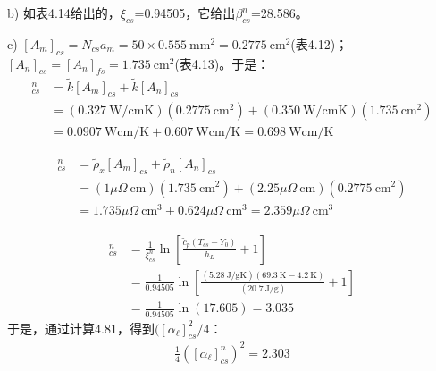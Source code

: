 b) 如表4.14给出的，$\xi_{cs}$=0.94505，它给出$\beta_{cs}^n$=28.586。

c) $[A_m]_{cs}=N_{cs} a_m=50\times 0.555\ \mathrm{mm^2}=0.2775\ \mathrm{cm^2}$(表4.12)；
$[A_n]_{cs}=[A_n]_{fs}=1.735\ \mathrm{cm^2}$(表4.13)。于是：
\begin{align*}%
[\tilde{kA}]_{cs}^{n}&=\tilde{k}[A_m]_{cs}+\tilde{k}[A_n]_{cs} \\
&=(0.327\ \mathrm{W/cmK})(0.2775\ \mathrm{cm^2})+(0.350\ \mathrm{W/cmK})(1.735\ \mathrm{cm^2}) \\
&=0.0907\ \mathrm{W cm/K}+0.607\ \mathrm{W cm/K}=0.698\ \mathrm{W cm/K} \tag{4.79}
\end{align*}

\begin{align*}%
[\tilde{\rho A}]_{cs}^{n}&=\tilde{\rho}_x[A_m]_{cs}+\tilde{\rho}_n[A_n]_{cs} \\
&=(1\mu\Omega\ \mathrm{cm})(1.735\ \mathrm{cm^2})+(2.25\mu\Omega\ \mathrm{cm})(0.2775\ \mathrm{cm^2}) \\
&=1.735\mu\Omega\ \mathrm{cm^3}+0.624\mu\Omega\ \mathrm{cm^3}=2.359\mu\Omega\ \mathrm{cm^3} \tag{4.82}
\end{align*}

\begin{align*}%
[\alpha_\ell]_{cs}^{n}&=\frac{1}{\xi_{cs}^{n}}\ln\left[\frac{\tilde{c}_p(T_{cs}-Y_0)}{h_L}+1\right] \\
&=\frac{1}{0.94505}\ln\left[\frac{(5.28\ \mathrm{J/gK})(69.3\ \mathrm{K}-4.2\ \mathrm{K})}{(20.7\ \mathrm{J/g})}+1\right] \\
&=\frac{1}{0.94505}\ln(17.605)=3.035 \tag{4.80b}
\end{align*}
于是，通过计算4.81，得到$([\alpha_\ell]_{cs}^2/4$：
\begin{align*}
\frac{1}{4}([\alpha_\ell]_{cs}^{n})^2=2.303
\end{align*}

